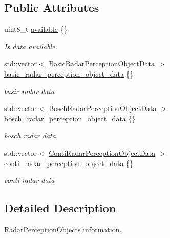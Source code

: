 \subsection*{Public Attributes}
\begin{DoxyCompactItemize}
\item 
uint8\+\_\+t \hyperlink{structmaf__perception__interface_1_1RadarPerceptionObjects_ad74bdbf527b79e7532f843b23886cf5e}{available} \{\}
\begin{DoxyCompactList}\small\item\em Is data available. \end{DoxyCompactList}\item 
std\+::vector$<$ \hyperlink{structmaf__perception__interface_1_1BasicRadarPerceptionObjectData}{Basic\+Radar\+Perception\+Object\+Data} $>$ \hyperlink{structmaf__perception__interface_1_1RadarPerceptionObjects_a71db1bf3a29c4f9df3f895210d304eca}{basic\+\_\+radar\+\_\+perception\+\_\+object\+\_\+data} \{\}
\begin{DoxyCompactList}\small\item\em basic radar data \end{DoxyCompactList}\item 
std\+::vector$<$ \hyperlink{structmaf__perception__interface_1_1BoschRadarPerceptionObjectData}{Bosch\+Radar\+Perception\+Object\+Data} $>$ \hyperlink{structmaf__perception__interface_1_1RadarPerceptionObjects_a1bb2273204b6c6ad2bf046871e503d4f}{bosch\+\_\+radar\+\_\+perception\+\_\+object\+\_\+data} \{\}
\begin{DoxyCompactList}\small\item\em bosch radar data \end{DoxyCompactList}\item 
std\+::vector$<$ \hyperlink{structmaf__perception__interface_1_1ContiRadarPerceptionObjectData}{Conti\+Radar\+Perception\+Object\+Data} $>$ \hyperlink{structmaf__perception__interface_1_1RadarPerceptionObjects_a79632a2befa979f1d5d5033fa25fd79b}{conti\+\_\+radar\+\_\+perception\+\_\+object\+\_\+data} \{\}
\begin{DoxyCompactList}\small\item\em conti radar data \end{DoxyCompactList}\end{DoxyCompactItemize}


\subsection{Detailed Description}
\hyperlink{structmaf__perception__interface_1_1RadarPerceptionObjects}{Radar\+Perception\+Objects} information. 

